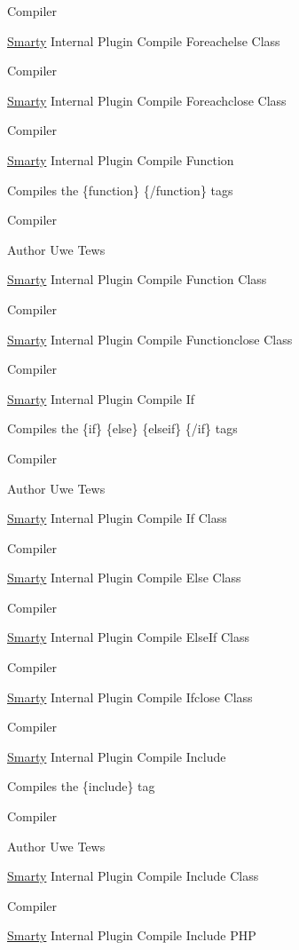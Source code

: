 Compiler

\hyperlink{class_smarty}{Smarty} Internal Plugin Compile Foreachelse Class

Compiler

\hyperlink{class_smarty}{Smarty} Internal Plugin Compile Foreachclose Class

Compiler

\hyperlink{class_smarty}{Smarty} Internal Plugin Compile Function

Compiles the \{function\} \{/function\} tags

Compiler \begin{DoxyAuthor}{Author}
Uwe Tews
\end{DoxyAuthor}
\hyperlink{class_smarty}{Smarty} Internal Plugin Compile Function Class

Compiler

\hyperlink{class_smarty}{Smarty} Internal Plugin Compile Functionclose Class

Compiler

\hyperlink{class_smarty}{Smarty} Internal Plugin Compile If

Compiles the \{if\} \{else\} \{elseif\} \{/if\} tags

Compiler \begin{DoxyAuthor}{Author}
Uwe Tews
\end{DoxyAuthor}
\hyperlink{class_smarty}{Smarty} Internal Plugin Compile If Class

Compiler

\hyperlink{class_smarty}{Smarty} Internal Plugin Compile Else Class

Compiler

\hyperlink{class_smarty}{Smarty} Internal Plugin Compile Else\+If Class

Compiler

\hyperlink{class_smarty}{Smarty} Internal Plugin Compile Ifclose Class

Compiler

\hyperlink{class_smarty}{Smarty} Internal Plugin Compile Include

Compiles the \{include\} tag

Compiler \begin{DoxyAuthor}{Author}
Uwe Tews
\end{DoxyAuthor}
\hyperlink{class_smarty}{Smarty} Internal Plugin Compile Include Class

Compiler

\hyperlink{class_smarty}{Smarty} Internal Plugin Compile Include P\+H\+P

